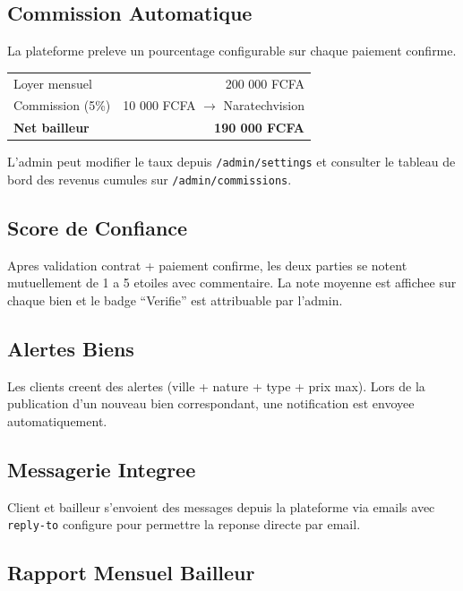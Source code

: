 \documentclass[12pt,a4paper]{article}
\begin{document}
\subsection{Commission Automatique}

La plateforme preleve un pourcentage configurable sur chaque paiement confirme.

\begin{center}
\begin{tabular}{|l|r|}
\hline
Loyer mensuel & 200 000 FCFA \\
Commission (5\%) & 10 000 FCFA $\to$ Naratechvision \\
\textbf{Net bailleur} & \textbf{190 000 FCFA} \\
\hline
\end{tabular}
\end{center}

L'admin peut modifier le taux depuis \texttt{/admin/settings} et consulter
le tableau de bord des revenus cumules sur \texttt{/admin/commissions}.

\subsection{Score de Confiance}

Apres validation contrat + paiement confirme, les deux parties se notent
mutuellement de 1 a 5 etoiles avec commentaire. La note moyenne est
affichee sur chaque bien et le badge ``Verifie'' est attribuable par l'admin.

\subsection{Alertes Biens}

Les clients creent des alertes (ville + nature + type + prix max).
Lors de la publication d'un nouveau bien correspondant, une notification
est envoyee automatiquement.

\subsection{Messagerie Integree}

Client et bailleur s'envoient des messages depuis la plateforme via emails
avec \texttt{reply-to} configure pour permettre la reponse directe par email.

\subsection{Rapport Mensuel Bailleur}
\end{document}
